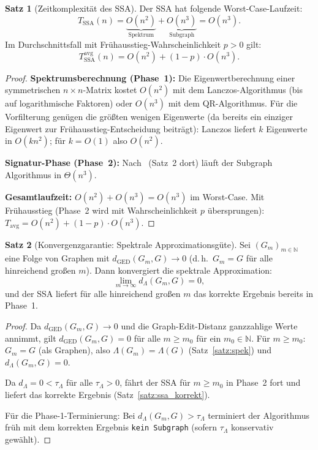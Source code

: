 ﻿\documentclass[a4paper,12pt]{article}
\theoremstyle{definition}
\newtheorem{satz}{Satz}
\begin{document}
\begin{satz}[Zeitkomplexität des SSA]
\label{satz:ssa_kompl}
    Der SSA hat folgende Worst-Case-Laufzeit:
    \[
    T_{\mathrm{SSA}}(n) = \underbrace{O(n^2)}_{\text{Spektrum}} + \underbrace{O(n^3)}_{\text{Subgraph}} = O(n^3).
    \]
    Im Durchschnittsfall mit Frühausstieg-Wahrscheinlichkeit $p > 0$ gilt:
    \[
    T_{\mathrm{SSA}}^{\mathrm{avg}}(n) = O(n^2) + (1-p)\cdot O(n^3).
    \]
\end{satz}

\begin{proof}
    \textbf{Spektrumsberechnung (Phase~1):}
    Die Eigenwertberechnung einer symmetrischen $n\times n$-Matrix kostet $O(n^2)$ mit dem
    Lanczos-Algorithmus (bis auf logarithmische Faktoren) oder $O(n^3)$ mit dem
    QR-Algorithmus. Für die Vorfilterung genügen die größten wenigen Eigenwerte
    (da bereits ein einziger Eigenwert zur Frühausstieg-Entscheidung beiträgt):
    Lanczos liefert $k$ Eigenwerte in $O(kn^2)$; für $k = O(1)$ also $O(n^2)$.

    \textbf{Signatur-Phase (Phase~2):}
    Nach~\cite{epp2026subgraph} (Satz~2 dort) läuft der Subgraph Algorithmus in $\Theta(n^3)$.

    \textbf{Gesamtlaufzeit:}
    $O(n^2) + O(n^3) = O(n^3)$ im Worst-Case.
    Mit Frühausstieg (Phase~2 wird mit Wahrscheinlichkeit $p$ übersprungen):
    $T_{\mathrm{avg}} = O(n^2) + (1-p)\cdot O(n^3)$. \qedhere
\end{proof}

\begin{satz}[Konvergenzgarantie: Spektrale Approximationsgüte]
\label{satz:konvgaran}
    Sei $(G_m)_{m\in\mathbb{N}}$ eine Folge von Graphen mit
    $d_{\mathrm{GED}}(G_m, G) \to 0$ (d.\,h.\ $G_m = G$ für alle hinreichend großen $m$).
    Dann konvergiert die spektrale Approximation:
    \[
    \lim_{m\to\infty} d_\Lambda(G_m, G) = 0,
    \]
    und der SSA liefert für alle hinreichend großen $m$ das korrekte Ergebnis bereits in
    Phase~1.
\end{satz}

\begin{proof}
    Da $d_{\mathrm{GED}}(G_m, G) \to 0$ und die Graph-Edit-Distanz ganzzahlige Werte annimmt,
    gilt $d_{\mathrm{GED}}(G_m, G) = 0$ für alle $m \geq m_0$ für ein $m_0 \in \mathbb{N}$.
    Für $m \geq m_0$: $G_m = G$ (als Graphen), also $\Lambda(G_m) = \Lambda(G)$
    (Satz~\ref{satz:spek}) und $d_\Lambda(G_m, G) = 0$.

    Da $d_\Lambda = 0 < \tau_\Lambda$ für alle $\tau_\Lambda > 0$, fährt der SSA für
    $m \geq m_0$ in Phase~2 fort und liefert das korrekte Ergebnis (Satz~\ref{satz:ssa_korrekt}).

    Für die Phase-1-Terminierung: Bei $d_\Lambda(G_m, G) > \tau_\Lambda$ terminiert der
    Algorithmus früh mit dem korrekten Ergebnis \texttt{kein Subgraph}
    (sofern $\tau_\Lambda$ konservativ gewählt). \qedhere
\end{proof}
\end{document}
